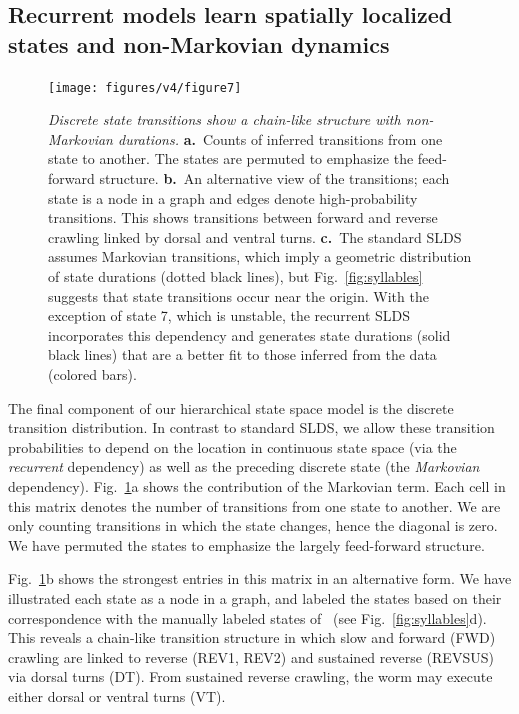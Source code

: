 \documentclass[11pt]{article}
\begin{document}
\clearpage

\subsection*{Recurrent models learn spatially localized states and non-Markovian dynamics}

\begin{figure}[t!]
\centering
\texttt{[image: figures/v4/figure7]} 
\caption{ \textit{Discrete state transitions show a chain-like structure
    with non-Markovian durations.}  \textbf{a.}~Counts of inferred transitions
  from one state to another. The states are permuted to emphasize the
  feed-forward structure.  \textbf{b.}~An alternative view of the
  transitions; each state is a node in a graph and edges denote
  high-probability transitions.  This shows transitions between
  forward and reverse crawling linked by dorsal and ventral turns.
  \textbf{c.}~The standard SLDS assumes Markovian transitions, which
  imply a geometric distribution of state durations (dotted black
  lines), but Fig.~\ref{fig:syllables} suggests that state
  transitions occur near the origin.  With the exception of state 7,
  which is unstable, the recurrent SLDS incorporates
  this dependency and generates state durations (solid black lines)
  that are a better fit to those inferred from the data (colored
  bars).  }
\label{fig:recurrent}
\end{figure}

The final component of our hierarchical state space model is the
discrete transition distribution.  In contrast to standard SLDS, we
allow these transition probabilities to depend on the location in
continuous state space (via the \emph{recurrent} dependency) as well as
the preceding discrete state (the \emph{Markovian} dependency).
Fig.~\ref{fig:recurrent}a shows the contribution of the Markovian
term.  Each cell in this matrix denotes the number of transitions from
one state to another. We are only counting transitions in which the
state changes, hence the diagonal is zero.  We have permuted the
states to emphasize the largely feed-forward structure.

Fig.~\ref{fig:recurrent}b shows the strongest entries in this matrix
in an alternative form.  We have illustrated each state as a node in a
graph, and labeled the states based on their correspondence with the
manually labeled states of~\citet{kato2015global} (see
Fig.~\ref{fig:syllables}d).  This reveals a chain-like transition
structure in which slow and forward (\textsf{FWD}) crawling are linked
to reverse (\textsf{REV1}, \textsf{REV2}) and sustained reverse
(\textsf{REVSUS}) via dorsal turns (\textsf{DT}). From sustained
reverse crawling, the worm may execute either dorsal or ventral turns
(\textsf{VT}).
\end{document}
